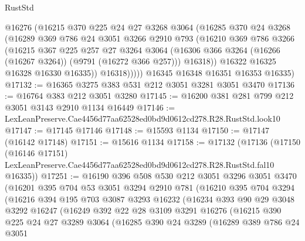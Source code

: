 \begin{lexlean}{RustStd}
\begin{coremodule}
              @16276
              (@16215
                @370
                @225
                @24
                @27
                @3268
                @3064
                (@16285
                  @370
                  @24
                  @3268
                  (@16289
                    @369
                    @786
                    @24
                    @3051
                    @3266
                    @2910
                    @793
                    (@16210
                      @369
                      @786
                      @3266
                      (@16215
                        @367
                        @225
                        @257
                        @27
                        @3264
                        @3064
                        (@16306 @366 @3264 (@16266 (@16267 @3264)) (@9791 (@16272 @366 @257)))
                        @16318))
                    @16322
                    @16325
                    @16328
                    @16330
                    @16335))
                @16318)))))
      @16345
      @16348
      @16351
      @16353
      @16335)
@17132 := @16365 @3275 @383 @531 @212 @3051 @3281 @3051 @3470
@17136 := @16764 @383 @212 @3051 @3280
@17145 := @16200 @381 @281 @799 @212 @3051 @3143 @2910 @1134 @16449
@17146 := LexLeanPreserve.Cae4456d77aa62528ed0bd9d0612cd278.R28.RustStd.look10
@17147 := @17145 @17146
@17148 := @15593 @1134
@17150 := @17147 (@16142 @17148)
@17151 := @15616 @1134
@17158 := @17132
    (@17136
      (@17150
        (@16146 @17151)
        LexLeanPreserve.Cae4456d77aa62528ed0bd9d0612cd278.R28.RustStd.fal10
        @16335))
@17251 := @16190
    @396
    @508
    @530
    @212
    @3051
    @3296
    @3051
    @3470
    (@16201
      @395
      @704
      @53
      @3051
      @3294
      @2910
      @781
      (@16210
        @395
        @704
        @3294
        (@16216
          @394
          @195
          @703
          @3087
          @3293
          @16232
          (@16234
            @393
            @90
            @29
            @3048
            @3292
            @16247
            (@16249
              @392
              @22
              @28
              @3109
              @3291
              @16276
              (@16215
                @390
                @225
                @24
                @27
                @3289
                @3064
                (@16285
                  @390
                  @24
                  @3289
                  (@16289
                    @389
                    @786
                    @24
                    @3051

\end{coremodule}
\end{lexlean}
